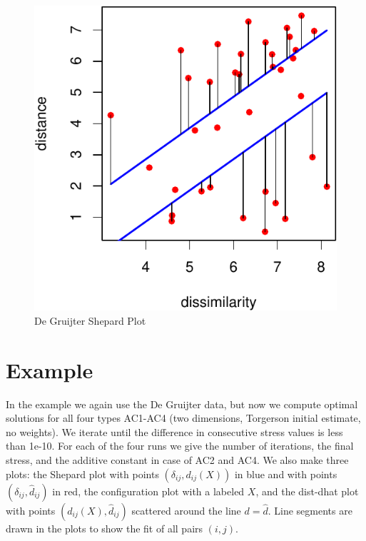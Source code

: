 \documentclass[
  12pt,
]{article}
\begin{document}
\begin{figure}

{\centering \includegraphics{smacofAC_files/figure-latex/optbandplot-1} 

}

\caption{De Gruijter Shepard Plot}\label{fig:optbandplot}
\end{figure}

\section{Example}\label{example}

In the example we again use the De Gruijter data, but now we compute optimal
solutions for all four types AC1-AC4 (two dimensions, Torgerson initial estimate,
no weights). We iterate until the difference in consecutive stress values is
less than 1e-10. For each of the four runs we give the number of iterations,
the final stress, and the additive constant in case of AC2 and AC4. We also
make three plots: the Shepard plot with points \((\delta_{ij},d_{ij}(X))\)
in blue and with points \((\delta_{ij},\hat d_{ij})\) in red, the configuration
plot with a labeled \(X\), and the dist-dhat plot with points \((d_{ij}(X),\hat d_{ij})\)
scattered around the line \(d=\hat d\). Line segments are drawn in the plots to
show the fit of all pairs \((i,j)\).
\end{document}
